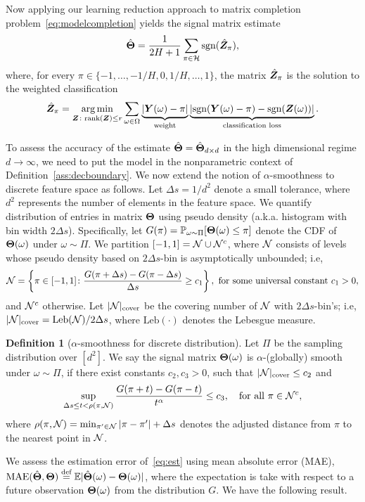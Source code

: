 \documentclass[aos]{imsart}
\theoremstyle{definition}
\newtheorem{definition}{Definition}
\newcommand*{\KeepStyleUnderBrace}[1]{%
\mathop{%
\mathchoice
{\underbrace{\displaystyle#1}}%
{\underbrace{\textstyle#1}}%
{\underbrace{\scriptstyle#1}}%
{\underbrace{\scriptscriptstyle#1}}%
}\limits
}
\def\sign{\textup{sgn}}
\def\rank{\textup{rank}}
\begin{document}
Now applying our learning reduction approach to matrix completion problem~\eqref{eq:modelcompletion} yields the signal matrix estimate
\begin{equation}\label{eq:est}
\hat \mTheta = {1\over 2H+1}\sum_{\pi \in \tH}\sign(\hat \mZ_\pi),
\end{equation}
where, for every $\pi\in\{-1,\ldots,-1/H,0,1/H,\ldots,1\}$, the matrix $\hat {\bm Z}_\pi$ is the solution to the weighted classification
\begin{equation*}
\hat \mZ_\pi = \argmin_{\mZ\colon \rank(\mZ)\leq r}\sum_{\omega\in\Omega} \KeepStyleUnderBrace{|\mY(\omega)-\pi|}_{\text{weight}}\KeepStyleUnderBrace{|\sign(\mY(\omega)-\pi)-\sign(\mZ(\omega))|}_{\text{classification loss}}.
\end{equation*}

\noindent
To assess the accuracy of the estimate $\hat {\bm{\Theta}}=\hat {\bm{\Theta}}_{d\times d}$ in the high dimensional regime $d\to \infty$, we need to put the model in the nonparametric context of Definition~\ref{ass:decboundary}. We now extend the notion of $\alpha$-smoothness to discrete feature space as follows. Let $\Delta s = 1/d^2$ denote a small tolerance, where $d^2$ represents the number of elements in the feature space. We quantify distribution of entries in matrix $\bm{\Theta}$ using pseudo density (a.k.a. histogram with bin width $2\Delta s$). Specifically, let $G(\pi)=\mathbb{P}_{\omega\sim \Pi}[\bm{\Theta}(\omega)\leq \pi]$ denote the CDF of $\bm{\Theta}(\omega)$ under $\omega\sim \Pi$. We partition $[-1,1]=\mathcal{N} \cup \mathcal{N}^c$, where $\mathcal{N}$ consists of levels whose pseudo density based on $2\Delta s$-bin is asymptotically unbounded; i.e,
\[
\mathcal{N}=\left\{\pi\in[-1,1] \colon {G(\pi+{\Delta s})-G(\pi-{\Delta s})\over \Delta s} \geq c_1 \right\},\ \text{for some universal constant }c_1>0,
\]
and $\mathcal{N}^c$ otherwise. Let $|\mathcal{N}|_{\text{cover}}$ be the covering number of $\mathcal{N}$ with $2\Delta s$-bin's; i.e, $|\mathcal{N}|_{\text{cover}} =\text{Leb}(\mathcal{N})/2\Delta s$, where $\text{Leb}(\cdot)$ denotes the Lebesgue measure. 

\begin{definition}[$\alpha$-smoothness for discrete distribution] Let $\Pi$ be the sampling distribution over $[d^2]$. We say the signal matrix $\bm{\Theta}(\omega)$ is $\alpha$-(globally) smooth under $\omega\sim \Pi$, if there exist constants $c_2,c_3>0$, such that $|\mathcal{N}|_{\text{cover}}\leq c_2$ and
\begin{equation}\label{eq:smooth}
\sup_{\Delta s \leq t<\rho(\pi, \tN)}{G(\pi+{t})-G(\pi-{t})\over t^\alpha} \leq c_3, \quad \text{for all }\pi \in\tN^c,
\end{equation}
where $\rho(\pi,\mathcal{N})=\min_{\pi'\in \mathcal{N}}|\pi-\pi'|+\Delta s$ denotes the adjusted distance from $\pi$ to the nearest point in $\mathcal{N}$. 
\end{definition}
We assess the estimation error of~\eqref{eq:est} using mean absolute error (MAE), $\text{MAE}(\hat {\bm{\Theta}}, \bm{\Theta})\stackrel{\text{def}}{=}\mathbb{E}|\hat {\bm{\Theta}}(\omega)-\bm{\Theta}(\omega)|$, where the expectation is take with respect to a future observation $\bm{\Theta}(\omega)$ from the distribution $G$.  We have the following result. 
\end{document}

